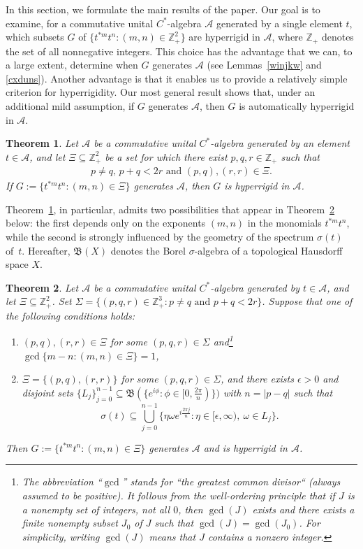\documentclass[reqno]{amsproc}
\numberwithin{equation}{section}
\newtheorem{theorem}{Theorem}[section]
\theoremstyle{remark}
\newcommand*{\ascr}{\mathscr{A}}
\newcommand*{\borel}{\mathfrak{B}}
\theoremstyle{definition}
\newcommand*{\zbb}{\mathbb{Z}}
\begin{document}
In this section, we formulate the main results of the
paper. Our goal is to examine, for a commutative
unital $C^*$-algebra $\ascr$ generated by a single
element $t$, which subsets $G$ of $\big\{t^{*m}
t^n\colon (m,n) \in \zbb_+^2\big\}$ are hyperrigid in
$\ascr$, where $\zbb_+$ denotes the set of all
nonnegative integers. This choice has the advantage
that we can, to a large extent, determine when $G$
generates $\ascr$ (see Lemmas~\ref{winjkw} and
\ref{cxduns}). Another advantage is that it enables us
to provide a relatively simple criterion for
hyperrigidity. Our most general result shows that,
under an additional mild assumption, if $G$ generates
$\ascr$, then $G$ is automatically hyperrigid in
$\ascr$.
   \begin{theorem} \label{hypth}
Let $\ascr$ be a commutative unital $C^*$-algebra
generated by an element $t\in \ascr$, and let $\varXi
\subseteq \zbb_+^2$ be a set for which there exist
$p,q,r\in \zbb_+$ such that
   \begin{align*}
\text{$p\neq q$, $p+q<2r$ and $(p,q), (r,r) \in
\varXi$.}
   \end{align*}
If $G:=\{t^{*m} t^n \colon (m,n) \in \varXi\}$
generates $\ascr$, then $G$ is hyperrigid in $\ascr$.
   \end{theorem}
Theorem~\ref{hypth}, in particular, admits two
possibilities that appear in Theorem~\ref{dsaqw}
below: the first depends only on the exponents $(m,n)$
in the monomials $t^{*m} t^n$, while the second is
strongly influenced by the geometry of the spectrum
$\sigma(t)$ of~$t$. Hereafter, $\borel(X)$ denotes the
Borel $\sigma$-algebra of a topological Hausdorff
space $X$.
   \begin{theorem} \label{dsaqw}
Let $\ascr$ be a commutative unital $C^*$-algebra
generated by $t\in \ascr$, and let $\varXi \subseteq
\zbb_+^2$. Set $\varSigma=\{(p,q,r)\in \zbb_+^3\colon
p\neq q \text{ and } p+q<2r\}$. Suppose that one of
the following conditions holds:
   \begin{enumerate}
   \item[(i)] $(p,q), (r,r) \in \varXi$
for some $(p,q,r) \in \varSigma$
and\/\footnote{\label{fitupi}The abbreviation
``$\gcd$'' stands for ``the greatest common divisor``
(always assumed to be positive). It follows from the
well-ordering principle that if $J$ is a nonempty set
of integers, not all $0$, then $\gcd(J)$ exists and
there exists a finite nonempty subset $J_0$ of $J$
such that $\gcd(J) = \gcd (J_0)$. For simplicity,
writing $\gcd(J)$ means that $J$ contains a nonzero
integer.} \mbox{$\gcd \{m-n\colon (m,n)\in
\varXi\}=1$},
   \item[(ii)]
$\varXi=\{(p,q), (r,r)\}$ for some $(p,q,r) \in
\varSigma$, and there exists $\epsilon
> 0$ and disjoint sets $\{L_j\}_{j=0}^{n-1} \subseteq
\borel(\{e^{i \phi}\colon \phi \in
[0,\frac{2\pi}{n})\})$ with $n = |p-q|$ such that
   $$ \sigma(t)  \subseteq \bigcup_{j=0}^{n-1}
\Big\{\eta \omega e^{i\frac{2\pi j}{n}} \colon \eta
\in[\epsilon,\infty),\: \omega \in L_j\Big\}.
   $$
   \end{enumerate}
   Then $G:=\{t^{*m} t^n \colon (m,n) \in \varXi\}$
generates $\ascr$ and is hyperrigid in $\ascr$.
   \end{theorem}
\end{document}
